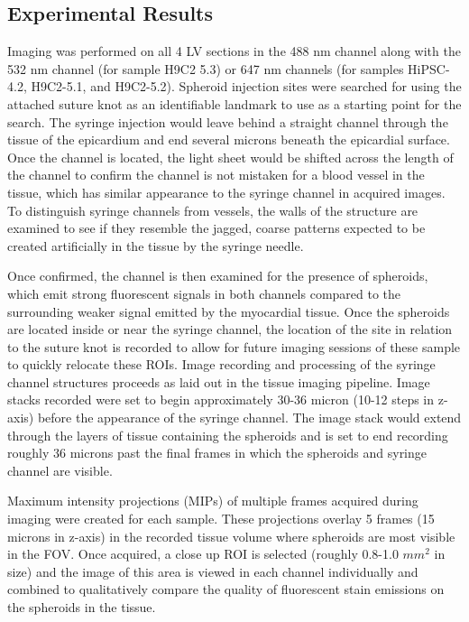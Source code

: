 \subsection{Experimental Results}

Imaging was performed on all 4 LV sections in the 488 nm channel along with the 532 nm channel (for sample H9C2 5.3) or 647 nm channels (for samples HiPSC-4.2, H9C2-5.1, and H9C2-5.2). Spheroid injection sites were searched for using the attached suture knot as an identifiable landmark to use as a starting point for the search. The syringe injection would leave behind a straight channel through the tissue of the epicardium and end several microns beneath the epicardial surface. Once the channel is located, the light sheet would be shifted across the length of the channel to confirm the channel is not mistaken for a blood vessel in the tissue, which has similar appearance to the syringe channel in acquired images. To distinguish syringe channels from vessels, the walls of the structure are examined to see if they resemble the jagged, coarse patterns expected to be created artificially in the tissue by the syringe needle. 

Once confirmed, the channel is then examined for the presence of spheroids, which emit strong fluorescent signals in both channels compared to the surrounding weaker signal emitted by the myocardial tissue. Once the spheroids are located inside or near the syringe channel, the location of the site in relation to the suture knot is recorded to allow for future imaging sessions of these sample to quickly relocate these ROIs. Image recording and processing of the syringe channel structures proceeds as laid out in the tissue imaging pipeline. Image stacks recorded were set to begin approximately 30-36 micron (10-12 steps in z-axis) before the appearance of the syringe channel. The image stack would extend through the layers of tissue containing the spheroids and is set to end recording roughly 36 microns past the final frames in which the spheroids and syringe channel are visible. 

Maximum intensity projections (MIPs) of multiple frames acquired during imaging were created for each sample. These projections overlay 5 frames (15 microns in z-axis) in the recorded tissue volume where spheroids are most visible in the FOV. Once acquired, a close up ROI is selected (roughly 0.8-1.0 $mm^2$ in size) and the image of this area is viewed in each channel individually and combined to qualitatively compare the quality of fluorescent stain emissions on the spheroids in the tissue.

